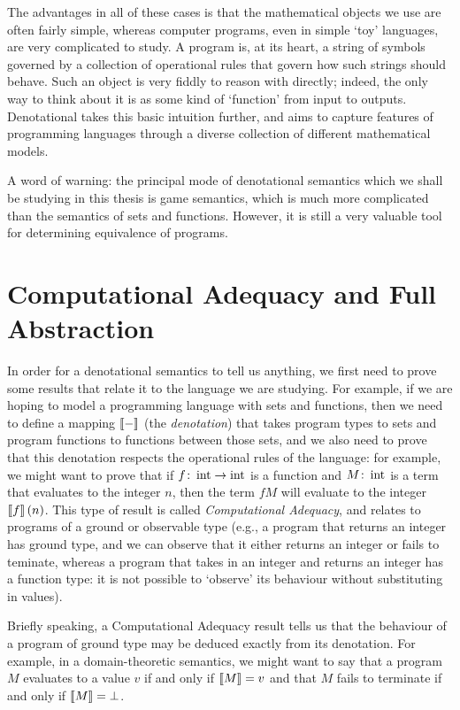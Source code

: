 \documentclass[11pt]{report}
\begin{document}
The advantages in all of these cases is that the mathematical objects we use are often fairly simple, whereas computer programs, even in simple `toy' languages, are very complicated to study. 
A program is, at its heart, a string of symbols governed by a collection of operational rules that govern how such strings should behave. 
Such an object is very fiddly to reason with directly; indeed, the only way to think about it is as some kind of `function' from input to outputs.
Denotational takes this basic intuition further, and aims to capture features of programming languages through a diverse collection of different mathematical models.

A word of warning: the principal mode of denotational semantics which we shall be studying in this thesis is game semantics, which is much more complicated than the semantics of sets and functions. 
However, it is still a very valuable tool for determining equivalence of programs.

\section{Computational Adequacy and Full Abstraction}

In order for a denotational semantics to tell us anything, we first need to prove some results that relate it to the language we are studying. 
For example, if we are hoping to model a programming language with sets and functions, then we need to define a mapping $\left\llbracket-\right\rrbracket$ (the \emph{denotation}) that takes program types to sets and program functions to functions between those sets, and we also need to prove that this denotation respects the operational rules of the language: for example, we might want to prove that if $f \colon \operatorname{int} \to \operatorname{int}$ is a function and $M \colon \operatorname{int}$ is a term that evaluates to the integer $n$, then the term $f M$ will evaluate to the integer $\left\llbracket f\right\rrbracket(n)$.
This type of result is called \emph{Computational Adequacy}, and relates to programs of a ground or observable type (e.g., a program that returns an integer has ground type, and we can observe that it either returns an integer or fails to teminate, whereas a program that takes in an integer and returns an integer has a function type: it is not possible to `observe' its behaviour without substituting in values).

Briefly speaking, a Computational Adequacy result tells us that the behaviour of a program of ground type may be deduced exactly from its denotation.
For example, in a domain-theoretic semantics, we might want to say that a program $M$ evaluates to a value $v$ if and only if $\left\llbracket M\right\rrbracket=v$ and that $M$ fails to terminate if and only if $\left\llbracket M\right\rrbracket = \bot$.
\end{document}
